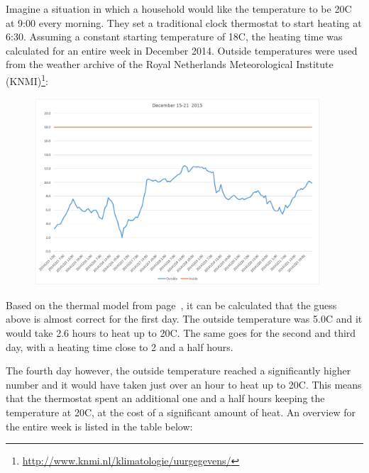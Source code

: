 \documentclass[12pt,a4paper,final]{report}
\begin{document}
Imagine a situation in which a household would like the temperature to be 20\degree{}C at 9:00 every morning. They set a traditional clock thermostat to start heating at 6:30. Assuming a constant starting temperature of 18\degree{}C, the heating time was calculated for an entire week in December 2014. Outside temperatures were used from the weather archive of the Royal Netherlands Meteorological Institute (KNMI)\footnote{\url{http://www.knmi.nl/klimatologie/uurgegevens/}}:
\begin{figure}[H]
  \begin{center}
      \includegraphics[width=0.95\textwidth]{EnergySavings-compare}
  \end{center}
\end{figure}

Based on the thermal model from page~\pageref{sec:usingModel}, it can be calculated that the guess above is almost correct for the first day. The outside temperature was 5.0\degree{}C and it would take 2.6 hours to heat up to 20\degree{}C. The same goes for the second and third day, with a heating time close to 2 and a half hours.

The fourth day however, the outside temperature reached a significantly higher number and it would have taken just over an hour to heat up to 20\degree{}C. This means that the thermostat spent an additional one and a half hours keeping the temperature at 20\degree{}C, at the cost of a significant amount of heat. An overview for the entire week is listed in the table below:
\end{document}
